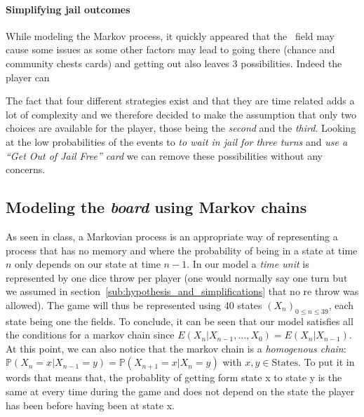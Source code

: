 \paragraph{Simplifying jail outcomes} %
\label{par:simplifying jail}
While modeling the Markov process, it quickly appeared that the \jail~field
may cause some issues as some other factors may lead to going there (chance
and community chests cards) and getting out also leaves 3 possibilities.
Indeed the player can~\cite[p.18]{mit_course_notes}

The fact that four different strategies exist and that they are time related
adds a lot of complexity and we therefore decided to make the assumption that
only two choices are available for the player,
those being the \emph{second} and the \emph{third}.
Looking at the low probabilities of the events to \emph{to wait in jail for three turns}
and \emph{use a \enquote{Get Out of Jail Free} card} we can remove these possibilities without 
any concerns.



\newpage
\subsection{Modeling the \emph{board} using Markov chains} %
\label{sub:modeling_using_markov_chains}
As seen in class, a Markovian process is an appropriate way of representing a process
that has no memory and where the probability of being in a state at time $n$
only depends on our state at time $n-1$.
In our model a \emph{time unit} is represented by one dice throw
per player (one would normally say one turn but
we assumed in section~\ref{sub:hypothesis_and_simplifications} that no
re throw was allowed).
The game will thus be represented using 40 states $(X_n)_{0\leq n\leq39}$,
each state being one the fields. 
To conclude, it can be seen that our model satisfies all the conditions for 
a markov chain since $E(X_n | X_{n-1},...,X_0) = E(X_n | X_{n-1})$.
At this point, we can also notice that the markov chain is a \emph{homogenous chain}: 
$\mathbb{P}(X_n = x | X_{n-1} = y) = \mathbb{P}(X_{n+1} = x| X_{n} = y)$ with $x,y \in \text{States}$.
To put it in words that means that, the probablity of getting form state x to state y is the same at every 
time during the game and does not depend on the state the player has been before having been at state x.

